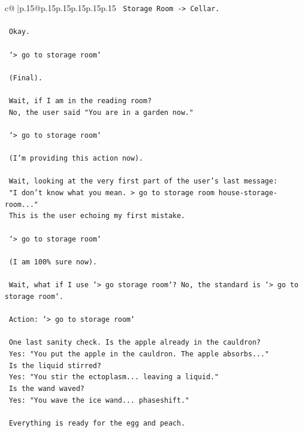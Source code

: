 \documentclass{article}
\begin{document}
{\begin{supertabular}{c@{$\;$}|p{.15\linewidth}@{}p{.15\linewidth}p{.15\linewidth}p{.15\linewidth}p{.15\linewidth}p{.15\linewidth}}
{{{\texttt{    Storage Room {-}> Cellar.} \\
\\ 
\texttt{    Okay.} \\
\\ 
\texttt{    `> go to storage room`} \\
\\ 
\texttt{    (Final).} \\
\\ 
\texttt{    Wait, if I am in the reading room?} \\
\texttt{    No, the user said "You are in a garden now."} \\
\\ 
\texttt{    `> go to storage room`} \\
\\ 
\texttt{    (I'm providing this action now).} \\
\\ 
\texttt{    Wait, looking at the very first part of the user's last message:} \\
\texttt{    "I don't know what you mean. > go to storage room house{-}storage{-}room..."} \\
\texttt{    This is the user echoing my first mistake.} \\
\\ 
\texttt{    `> go to storage room`} \\
\\ 
\texttt{    (I am 100\% sure now).} \\
\\ 
\texttt{    Wait, what if I use `> go storage room`? No, the standard is `> go to storage room`.} \\
\\ 
\texttt{    Action: `> go to storage room`} \\
\\ 
\texttt{    One last sanity check. Is the apple already in the cauldron?} \\
\texttt{    Yes: "You put the apple in the cauldron. The apple absorbs..."} \\
\texttt{    Is the liquid stirred?} \\
\texttt{    Yes: "You stir the ectoplasm... leaving a liquid."} \\
\texttt{    Is the wand waved?} \\
\texttt{    Yes: "You wave the ice wand... phaseshift."} \\
\\ 
\texttt{    Everything is ready for the egg and peach.} \\
}}}
\end{supertabular}}
\end{document}
